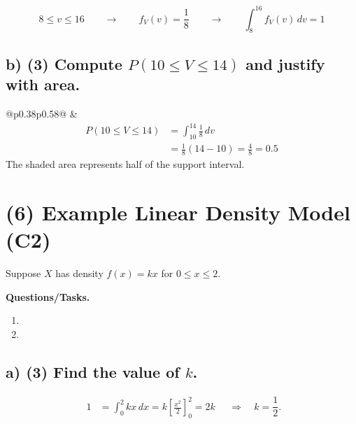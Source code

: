 \[
8\le v\le 16
\qquad \longrightarrow \qquad
f_V(v)=\frac18
\qquad \longrightarrow \qquad
\int_8^{16} f_V(v)\,dv=1
\]


\subsection*{b) \textbf{(3)} Compute $P(10\le V\le 14)$ and justify with area.}
\label{subsec:example-uniform-investment-plan-c1-b}
\begin{center}
    \setlength{\tabcolsep}{3pt}
    \renewcommand{\arraystretch}{1.08}
    \begin{tabular}{@{}p{}p{}@{}}
        \centering
         &
        \[
        \begin{aligned}
        P(10\le V\le 14)
        &=\int_{10}^{14} \frac18\,dv\\
        &=\frac18(14-10)=\frac48=0.5
        \end{aligned}
        \]
        The shaded area represents half of the support interval.
    \end{tabular}
\end{center}


\section{(6) Example Linear Density Model (C2)}
\label{sec:example-linear-density-model-c2}
Suppose $X$ has density $f(x)=kx$ for $0\le x\le 2$.

\textbf{Questions/Tasks.}
\begin{enumerate}[label=\textbf{\alph*)}]
    \item {}
    \item {}
\end{enumerate}

\subsection*{a) \textbf{(3)} Find the value of $k$.}
\label{subsec:example-linear-density-model-c2-a}
\[
\begin{aligned}
1&=\int_0^2 kx\,dx
= k\left[\frac{x^2}{2}\right]_0^2
=2k
\end{aligned}
\quad\Rightarrow\quad k=\frac12.
\]

